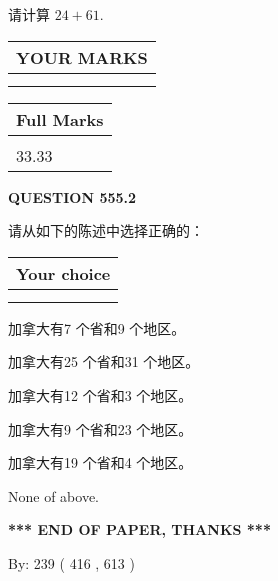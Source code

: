 \documentclass{ctexart}
\begin{document}
  
 
请计算 $ %
24 +  %
61 $.
 

 

 
  
\vspace{0.2in}
  
\noindent\begin{tabular}{|l|}
\hline
 YOUR MARKS  \\
\hline
 \\ 
 \\ 
\hline
\end{tabular}
\hspace{0.05in} \begin{tabular}{|l|}
\hline
 Full Marks  \\
\hline
 \\ 
33.33 \\
\hline
\end{tabular}
{\textbf{\Large{QUESTION
555.2 
}}}
  
  
请从如下的陈述中选择正确的：
  
  
\noindent\hspace{3.0in} \begin{tabular}{|l|}
\hline
Your choice \\
\hline
 \\ 
 \\ 
\hline
\end{tabular}
  
  
 
 
加拿大有7 个省和9 个地区。
 
 
加拿大有25 个省和31 个地区。
 
 
加拿大有12 个省和3 个地区。
 
 
加拿大有9 个省和23 个地区。
 
 
加拿大有19 个省和4 个地区。
 
 
 None of above.
 
 
   
   
 \vspace{0.2in}
 
   
   
   
   
\vspace{1.0in} 
{\textbf{\large{ *** END OF PAPER, THANKS *** }}} 
   
   
\hspace{1.0in} By: 
 239 ( 416 ,  613 )
   
\end{document}
